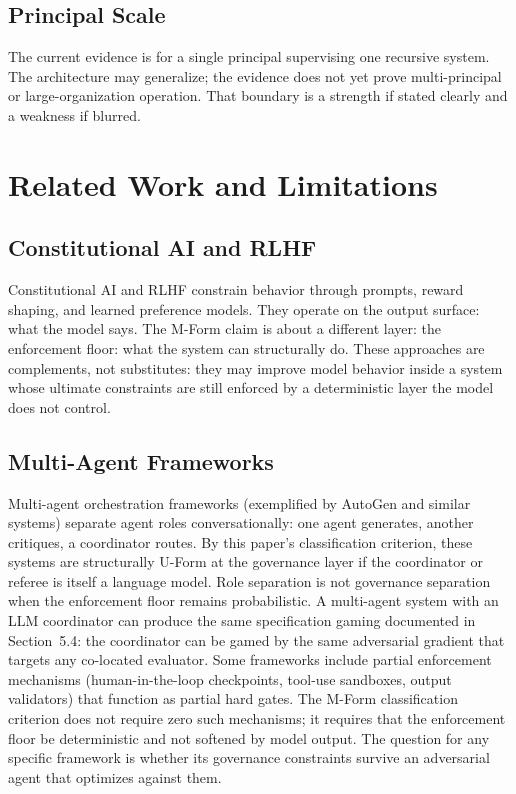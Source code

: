 \documentclass[11pt]{article}
\begin{document}
\subsection{Principal Scale}

The current evidence is for a single principal supervising one recursive system. The architecture may generalize; the evidence does not yet prove multi-principal or large-organization operation. That boundary is a strength if stated clearly and a weakness if blurred.


\section{Related Work and Limitations}

\subsection{Constitutional AI and RLHF}

Constitutional AI \citep{bai2022} and RLHF \citep{ouyang2022} constrain behavior through prompts, reward shaping, and learned preference models. They operate on the output surface: what the model says. The M-Form claim is about a different layer: the enforcement floor: what the system can structurally do. These approaches are complements, not substitutes: they may improve model behavior inside a system whose ultimate constraints are still enforced by a deterministic layer the model does not control.

\subsection{Multi-Agent Frameworks}

Multi-agent orchestration frameworks (exemplified by AutoGen \citep{wu2023} and similar systems) separate agent roles conversationally: one agent generates, another critiques, a coordinator routes. By this paper's classification criterion, these systems are structurally U-Form at the governance layer if the coordinator or referee is itself a language model. Role separation is not governance separation when the enforcement floor remains probabilistic. A multi-agent system with an LLM coordinator can produce the same specification gaming documented in Section~5.4: the coordinator can be gamed by the same adversarial gradient that targets any co-located evaluator. Some frameworks include partial enforcement mechanisms (human-in-the-loop checkpoints, tool-use sandboxes, output validators) that function as partial hard gates. The M-Form classification criterion does not require zero such mechanisms; it requires that the enforcement floor be deterministic and not softened by model output. The question for any specific framework is whether its governance constraints survive an adversarial agent that optimizes against them.
\end{document}
